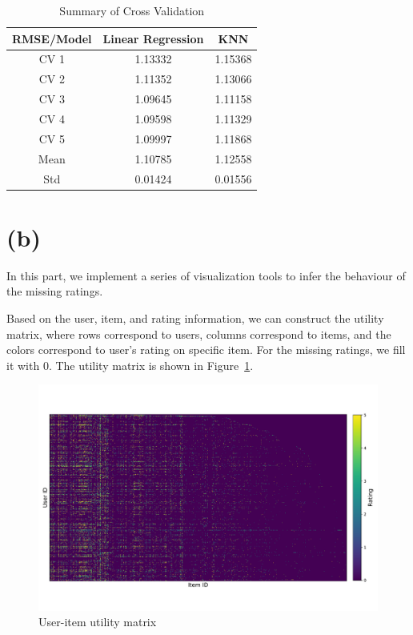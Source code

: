 \begin{table}[htbp]
 \caption{Summary of Cross Validation} \label{result}
 \vspace{0.1in}
\begin{center}
  \begin{tabular}{  c  c  c}
    \hline
    RMSE/Model        & Linear Regression        & KNN      \\ \hline
    CV 1                     & 1.13332                           & 1.15368 \\ \hline
    CV 2                    & 1.11352                            & 1.13066 \\ \hline
    CV 3                    & 1.09645                           & 1.11158 \\ \hline
    CV 4                    & 1.09598                           & 1.11329 \\ \hline
    CV 5                    & 1.09997                           & 1.11868  \\ \hline
    Mean                   & 1.10785                           &  1.12558 \\ \hline 
    Std                      & 0.01424                           &  0.01556 \\ \hline 
  \end{tabular}
\end{center}
\end{table}

\section*{(b)}

In this part, we implement a series of visualization tools to infer the behaviour of the missing ratings.

Based on the user, item, and rating information, we can construct the utility matrix, where rows correspond to users, columns correspond to items, and the colors correspond to user's rating on specific item. For the missing ratings, we fill it with 0. The utility matrix is shown in Figure~\ref{fig:utility}.

\begin{figure}[htbp]
\centering
\includegraphics[width=1.0\textwidth]{./figures/utility.pdf}
\caption{User-item utility matrix}
\label{fig:utility} 
\end{figure}

